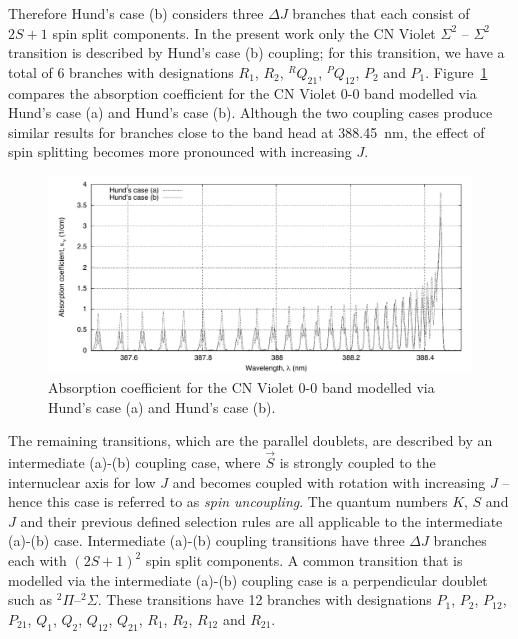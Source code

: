 Therefore Hund's case (b) considers three $\Delta J$ branches that each consist of $2S+1$ spin split components.
In the present work only the CN Violet $\Sigma^2$ -- $\Sigma^2$ transition is described by Hund's case (b) coupling; for this transition, we have a total of 6 branches with designations $R_1$, $R_2$, $^{R}Q_{21}$, $^{P}Q_{12}$, $P_2$ and $P_1$.
Figure~\ref{fig:Violet_a_vs_b} compares the absorption coefficient for the CN Violet 0-0 band modelled via Hund's case (a) and Hund's case (b).
Although the two coupling cases produce similar results for branches close to the band head at 388.45~nm, the effect of spin splitting becomes more pronounced with increasing $J$.

\begin{figure}[htb]
 \includegraphics[width=\linewidth]{figures/spectral-modelling/CN_violet_absorption_coefficient_spectra_linear.pdf}
 \caption{Absorption coefficient for the CN Violet 0-0 band modelled via Hund's case (a) and Hund's case (b).}
 \label{fig:Violet_a_vs_b}
\end{figure}

\par


The remaining transitions, which are the parallel doublets, are described by an intermediate (a)-(b) coupling case, where $\vec{S}$ is strongly coupled to the internuclear axis for low $J$ and becomes coupled with rotation with increasing $J$ -- hence this case is referred to as \textit{spin uncoupling}.
The quantum numbers $K$, $S$ and $J$ and their previous defined selection rules are all applicable to the intermediate (a)-(b) case.
Intermediate (a)-(b) coupling transitions have three $\Delta J$ branches each with $\left( 2S + 1 \right)^2$ spin split components.
A common transition that is modelled via the intermediate (a)-(b) coupling case is a perpendicular doublet such as $^2 \Pi$--$^2 \Sigma$.
These transitions have 12 branches with designations $P_{1}$, $P_2$, $P_{12}$, $P_{21}$, $Q_{1}$, $Q_2$, $Q_{12}$, $Q_{21}$, $R_{1}$, $R_2$, $R_{12}$ and $R_{21}$.

